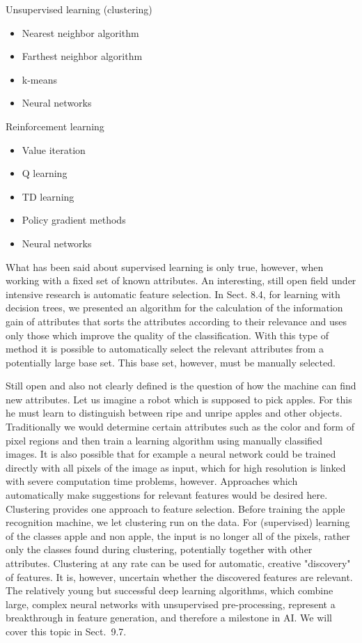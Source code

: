 \documentclass[10pt]{book}
\begin{document}
Unsupervised learning (clustering)

\begin{itemize}
  \item Nearest neighbor algorithm
  \item Farthest neighbor algorithm
  \item k-means
  \item Neural networks
\end{itemize}

Reinforcement learning

\begin{itemize}
  \item Value iteration
  \item Q learning
  \item TD learning
  \item Policy gradient methods
  \item Neural networks
\end{itemize}

What has been said about supervised learning is only true, however, when working with a fixed set of known attributes. An interesting, still open field under intensive research is automatic feature selection. In Sect. 8.4, for learning with decision trees, we presented an algorithm for the calculation of the information gain of attributes that sorts the attributes according to their relevance and uses only those which improve the quality of the classification. With this type of method it is possible to automatically select the relevant attributes from a potentially large base set. This base set, however, must be manually selected.

Still open and also not clearly defined is the question of how the machine can find new attributes. Let us imagine a robot which is supposed to pick apples. For this he must learn to distinguish between ripe and unripe apples and other objects. Traditionally we would determine certain attributes such as the color and form of pixel regions and then train a learning algorithm using manually classified images. It is also possible that for example a neural network could be trained directly with all pixels of the image as input, which for high resolution is linked with severe computation time problems, however. Approaches which automatically make suggestions for relevant features would be desired here.
Clustering provides one approach to feature selection. Before training the apple recognition machine, we let clustering run on the data. For (supervised) learning of the classes apple and non apple, the input is no longer all of the pixels, rather only the classes found during clustering, potentially together with other attributes. Clustering at any rate can be used for automatic, creative "discovery" of features. It is, however, uncertain whether the discovered features are relevant. The relatively young but successful deep learning algorithms, which combine large, complex neural networks with unsupervised pre-processing, represent a breakthrough in feature generation, and therefore a milestone in AI. We will cover this topic in Sect.~9.7.
\end{document}
